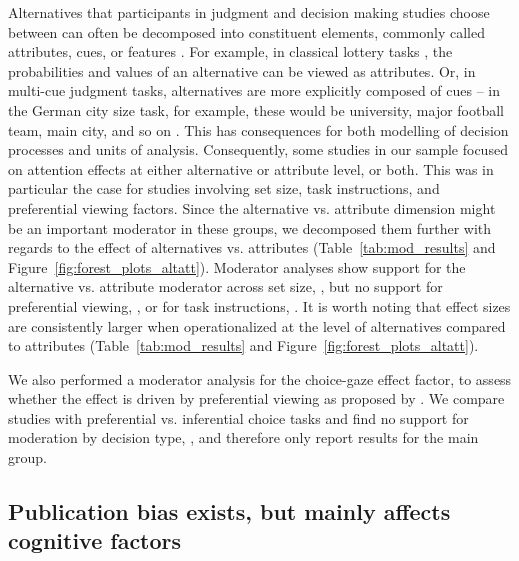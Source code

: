 Alternatives that participants in judgment and decision making studies choose between can often be decomposed into constituent elements, commonly called attributes, cues, or features \citep{payne1988,tversky1972elimination,stojic2020s,gigerenzer1996reasoning,schulz2018putting,hogarth2007heuristic}. For example, in classical lottery tasks \citep{tversky1979}, the probabilities and values of an alternative can be viewed as attributes. Or, in multi-cue judgment tasks, alternatives are more explicitly composed of cues -- in the German city size task, for example, these would be university, major football team, main city, and so on \citep{gigerenzer1996reasoning}. This has consequences for both modelling of decision processes and units of analysis. Consequently, some studies in our sample focused on attention effects at either alternative or attribute level, or both. This was in particular the case for studies involving set size, task instructions, and preferential viewing factors. Since the alternative vs. attribute dimension might be an important moderator in these groups, we decomposed them further with regards to the effect of alternatives vs. attributes (Table~\ref{tab:mod_results} and Figure~\ref{fig:forest_plots_altatt}). Moderator analyses show support for the alternative vs. attribute moderator across set size, \unskip, but no support for preferential viewing, \unskip, or for task instructions, \unskip. It is worth noting that effect sizes are consistently larger when operationalized at the level of alternatives compared to attributes (Table~\ref{tab:mod_results} and Figure~\ref{fig:forest_plots_altatt}). 

We also performed a moderator analysis for the choice-gaze effect factor, to assess whether the effect is driven by preferential viewing as proposed by \cite{shimojo2003a}. We compare studies with preferential vs. inferential choice tasks and find no support for moderation by decision type, \unskip, and therefore only report results for the main group. 



\subsection{Publication bias exists, but mainly affects cognitive factors}

